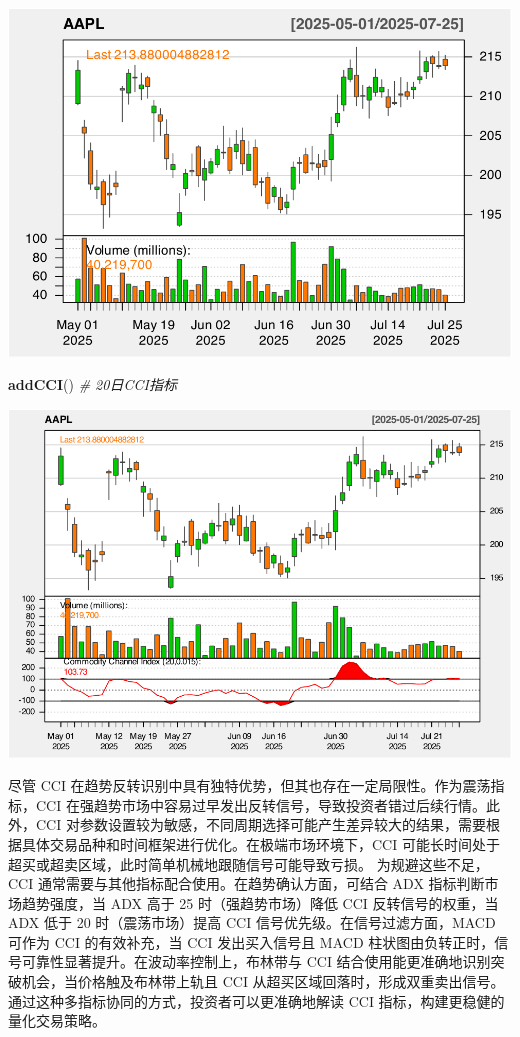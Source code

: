 \documentclass[]{ctexbook}
\newenvironment{Shaded}{\begin{snugshade}}{\end{snugshade}}
\newcommand{\CommentTok}[1]{\textcolor[rgb]{0.56,0.35,0.01}{\textit{#1}}}
\newcommand{\FunctionTok}[1]{\textcolor[rgb]{0.13,0.29,0.53}{\textbf{#1}}}
\newcommand{\NormalTok}[1]{#1}
\begin{document}
\includegraphics[width=0.9\linewidth]{QuantmodHandbook_files/figure-latex/cci-1}

\begin{Shaded}
\begin{Highlighting}[]
\FunctionTok{addCCI}\NormalTok{()  }\CommentTok{\# 20日CCI指标}
\end{Highlighting}
\end{Shaded}

\includegraphics[width=0.9\linewidth]{QuantmodHandbook_files/figure-latex/cci-2}

尽管 CCI 在趋势反转识别中具有独特优势，但其也存在一定局限性。作为震荡指标，CCI 在强趋势市场中容易过早发出反转信号，导致投资者错过后续行情。此外，CCI 对参数设置较为敏感，不同周期选择可能产生差异较大的结果，需要根据具体交易品种和时间框架进行优化。在极端市场环境下，CCI 可能长时间处于超买或超卖区域，此时简单机械地跟随信号可能导致亏损。
为规避这些不足，CCI 通常需要与其他指标配合使用。在趋势确认方面，可结合 ADX 指标判断市场趋势强度，当 ADX 高于 25 时（强趋势市场）降低 CCI 反转信号的权重，当 ADX 低于 20 时（震荡市场）提高 CCI 信号优先级。在信号过滤方面，MACD 可作为 CCI 的有效补充，当 CCI 发出买入信号且 MACD 柱状图由负转正时，信号可靠性显著提升。在波动率控制上，布林带与 CCI 结合使用能更准确地识别突破机会，当价格触及布林带上轨且 CCI 从超买区域回落时，形成双重卖出信号。通过这种多指标协同的方式，投资者可以更准确地解读 CCI 指标，构建更稳健的量化交易策略。
\end{document}

